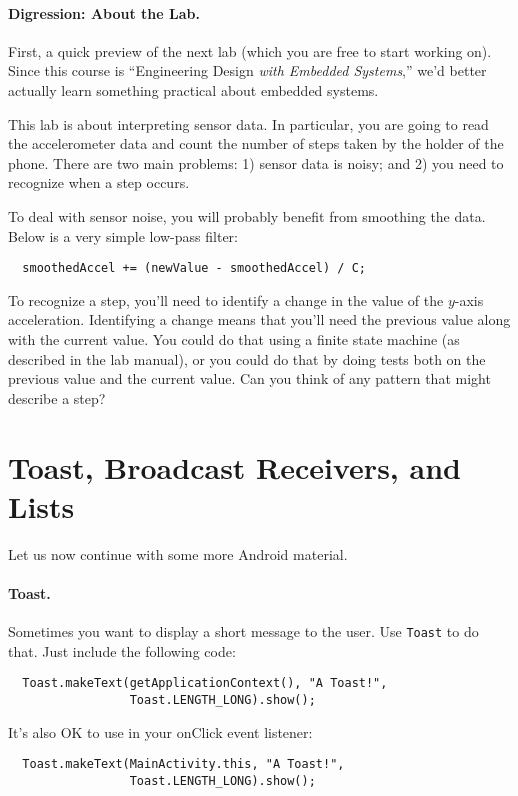 \paragraph{Digression: About the Lab.} First, a quick preview of 
the next lab (which you are free to start working on). Since this
course is ``Engineering Design \emph{with Embedded Systems},'' we'd
better actually learn something practical about embedded systems.

This lab is about interpreting sensor data. In particular, you are going to
read the accelerometer data and count the number of steps taken by the holder
of the phone. There are two main problems: 1) sensor data is noisy; and 2) you need
to recognize when a step occurs.

To deal with sensor noise, you will probably benefit from smoothing the data.
Below is a very simple low-pass filter:

\begin{verbatim}
  smoothedAccel += (newValue - smoothedAccel) / C;
\end{verbatim}

To recognize a step, you'll need to identify a change in the value of the $y$-axis
acceleration. Identifying a change means that you'll need the previous value along
with the current value. You could do that using a finite state machine (as described
in the lab manual), or you could do that by doing tests both on the previous value 
and the current value. Can you think of any pattern that might describe a step?

\section*{Toast, Broadcast Receivers, and Lists}

Let us now continue with some more Android material.

\paragraph{Toast.} Sometimes you want to display a short message to the user.
Use {\tt Toast} to do that. Just include the following code:
\begin{verbatim}
  Toast.makeText(getApplicationContext(), "A Toast!", 
                 Toast.LENGTH_LONG).show();
\end{verbatim}
It's also OK to use in your onClick event listener:
\begin{verbatim}
  Toast.makeText(MainActivity.this, "A Toast!", 
                 Toast.LENGTH_LONG).show();
\end{verbatim}

